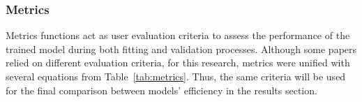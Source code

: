 \subsubsection{Metrics}
Metrics functions act as user evaluation criteria to assess the performance of the trained model during both fitting and validation processes.
Although some papers relied on different evaluation criteria, for this research, metrics were unified with several equations from Table~\ref{tab:metrics}.
Thus, the same criteria will be used for the final comparison between models' efficiency in the results section.
\begin{table}[htbp]
    \renewcommand{\arraystretch}{1.3}
    \caption{Model's metrics functions}
    \centering
    \label{tab:metrics}
\end{table}
